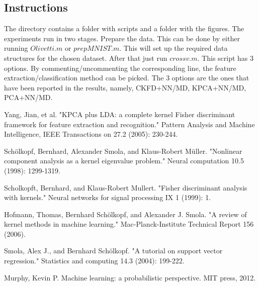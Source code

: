 \documentclass[7 pt]{article}
\begin{document}
\begin{multicols}{2}
\section{Instructions}
The directory contains a folder with scripts and a folder with the figures. The experiments run in two stages. 
Prepare the data. This can be done by either running 
$Olivetti.m$ or $prepMNIST.m$. This will set up the required data structures for the chosen dataset.
After that just run $crossv.m$. This script has 3 options. By commenting/uncommenting the corresponding line, the feature extraction/classification method can be picked. The 3 options are the ones that have been reported in the results, namely, CKFD+NN/MD, KPCA+NN/MD, PCA+NN/MD.



 \begin{thebibliography}{9}
 Yang, Jian, et al. "KPCA plus LDA: a complete kernel Fisher discriminant framework for feature extraction and recognition." Pattern Analysis and Machine Intelligence, IEEE Transactions on 27.2 (2005): 230-244.

Schölkopf, Bernhard, Alexander Smola, and Klaus-Robert Müller. "Nonlinear component analysis as a kernel eigenvalue problem." Neural computation 10.5 (1998): 1299-1319. 
 
Scholkopft, Bernhard, and Klaus-Robert Mullert. "Fisher discriminant analysis with kernels." Neural networks for signal processing IX 1 (1999): 1. 

Hofmann, Thomas, Bernhard Schölkopf, and Alexander J. Smola. "A review of kernel methods in machine learning." Mac-Planck-Institute Technical Report 156 (2006). 

Smola, Alex J., and Bernhard Schölkopf. "A tutorial on support vector regression." Statistics and computing 14.3 (2004): 199-222. 

Murphy, Kevin P. Machine learning: a probabilistic perspective. MIT press, 2012.
  
 
 \end{thebibliography}
 

\end{multicols}
\end{document}
